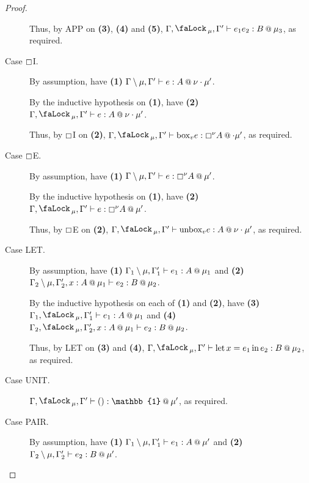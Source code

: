 \documentclass[acmsmall,screen,nonacm]{acmart}
\makeatletter
\DeclareMathOperator{\llet}{\text{let}}
\DeclareMathOperator{\lin}{\text{in}}
\newcommand{\at}{\mathbin{\mbox{\small\ensuremath{@}}}}
\newcommand{\unit}{\mathbb{1}}
\newcommand{\tee}{\vdash}
\DeclareMathOperator{\lock}{\tikz{\node[scale=1, line width=0pt, inner sep=0pt] at (0,0) {\faLock\,};}}
\makeatother
\begin{document}
\begin{proof}
\begin{description}
    Thus, by APP on \textbf{(3)}, \textbf{(4)} and \textbf{(5)}, $\Gamma, \lock_\mu, \Gamma^\prime \tee e_1 e_2 : B \at \mu_3$, as required.
    \\
    \item[Case $\boxempty$I.]
    By assumption, have \textbf{(1)} $\Gamma \setminus \mu, \Gamma^\prime \tee e : A \at \nu \cdot \mu^\prime$. 
    
    By the inductive hypothesis on \textbf{(1)}, have \textbf{(2)} $\Gamma, \lock_\mu, \Gamma^\prime \tee e : A \at \nu \cdot \mu^\prime$. 
    
    Thus, by $\boxempty$I on \textbf{(2)}, $\Gamma, \lock_\mu, \Gamma^\prime \tee \mathrm{box}_v e : \boxempty^\nu A \at \cdot \mu^\prime$, as required.
    \\
    \item[Case $\boxempty$E.]
    By assumption, have \textbf{(1)} $\Gamma \setminus \mu, \Gamma^\prime \tee e : \boxempty^\nu A \at \mu^\prime$. 
    
    By the inductive hypothesis on \textbf{(1)}, have \textbf{(2)} $\Gamma, \lock_\mu, \Gamma^\prime \tee e : \boxempty^\nu A \at \mu^\prime$. 
    
    Thus, by $\boxempty$E on \textbf{(2)}, $\Gamma, \lock_\mu, \Gamma^\prime \tee \mathrm{unbox}_v e : A \at \nu \cdot \mu^\prime$, as required.
    \\
    \item[Case LET.]
    By assumption, have \textbf{(1)} $\Gamma_1 \setminus \mu, \Gamma^\prime_1 \tee e_1 : A \at \mu_1$ and \textbf{(2)} $\Gamma_2 \setminus \mu, \Gamma^\prime_2, x : A \at \mu_1 \tee e_2 : B \at \mu_2$. 
    
    By the inductive hypothesis on each of \textbf{(1)} and \textbf{(2)}, have \textbf{(3)} $\Gamma_1, \lock_\mu, \Gamma^\prime_1 \tee e_1 : A \at \mu_1$ and \textbf{(4)} $\Gamma_2, \lock_\mu, \Gamma^\prime_2, x : A \at \mu_1 \tee e_2 : B \at \mu_2$. 
    
    Thus, by LET on \textbf{(3)} and \textbf{(4)}, $\Gamma, \lock_\mu, \Gamma^\prime \tee \llet x = e_1 \lin e_2 : B \at \mu_2$, as required.
    \\
    \item[Case UNIT.]
    $\Gamma, \lock_\mu, \Gamma^\prime \tee () : \unit \at \mu^\prime$, as required.
    \\
    \item[Case PAIR.]
    By assumption, have \textbf{(1)} $\Gamma_1 \setminus \mu, \Gamma^\prime_1 \tee e_1 : A \at \mu^\prime$ and \textbf{(2)} $\Gamma_2 \setminus \mu, \Gamma^\prime_2 \tee e_2 : B \at \mu^\prime$. 
    

\end{description}
\end{proof}
\end{document}
